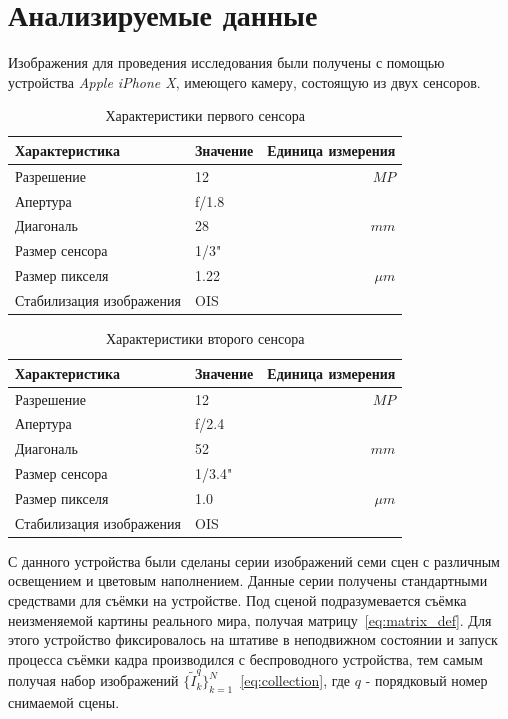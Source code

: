 \section{Анализируемые данные}
Изображения для проведения исследования были получены с помощью устройства \textit{Apple iPhone X}, имеющего камеру, состоящую из двух сенсоров.

\begin{table}[h!]
	\centering
	\caption{\label{tab:cam1}Характеристики первого сенсора}
	\begin{tabular}{llr}
		\toprule
		Характеристика  & Значение    & Единица измерения \\
		\midrule
		Разрешение & 12    & $MP$  \\
		Апертура & f/1.8 & \\
		Диагональ & 28 & $mm$ \\
		Размер сенсора & 1/3" & \\
		Размер пикселя & 1.22 & $\mu m$ \\
		Стабилизация изображения & OIS & \\
		\bottomrule
	\end{tabular}
\end{table}

\begin{table}[h!]
	\centering
	\caption{\label{tab:cam2}Характеристики второго сенсора}
	\begin{tabular}{llr}
		\toprule
		Характеристика  & Значение    & Единица измерения \\
		\midrule
		Разрешение & 12    & $MP$  \\
		Апертура & f/2.4 & \\
		Диагональ & 52 & $mm$ \\
		Размер сенсора & 1/3.4" & \\
		Размер пикселя & 1.0 & $\mu m$ \\
		Стабилизация изображения & OIS & \\
		\bottomrule
	\end{tabular}
\end{table}

С данного устройства были сделаны серии изображений семи сцен с различным освещением и цветовым наполнением. Данные серии получены стандартными средствами для съёмки на устройстве. Под сценой подразумевается съёмка неизменяемой картины реального мира, получая матрицу~\ref{eq:matrix_def}. Для этого устройство фиксировалось на штативе в неподвижном состоянии  и запуск процесса съёмки кадра производился  с беспроводного устройства, тем самым получая набор изображений $\{\tilde{I}^q_k\}_{k=1}^{N}$~\ref{eq:collection}, где $q$ - порядковый номер снимаемой сцены.

